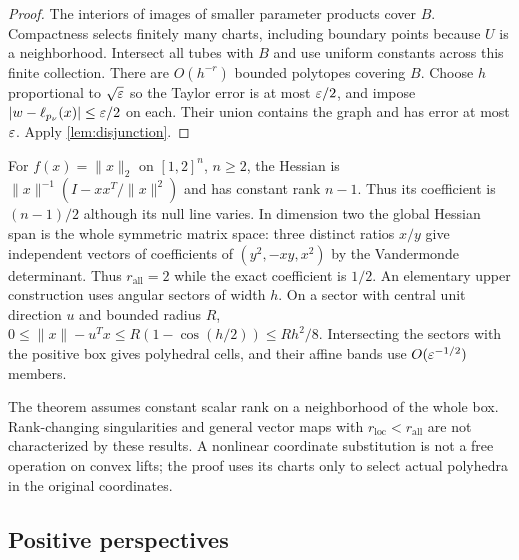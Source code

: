 \begin{proof}
The interiors of images of smaller parameter products cover $B$.
Compactness selects finitely many charts, including boundary points
because $U$ is a neighborhood. Intersect all tubes with $B$ and use
uniform constants across this finite collection. There are
$O(h^{-r})$ bounded polytopes covering $B$. Choose $h$ proportional
to $\sqrt{\varepsilon}$ so the Taylor error is at most $\varepsilon/2$, and impose
$|w-\ell_{p_\nu}(x)|\le\varepsilon/2$ on each. Their union contains the graph
and has error at most $\varepsilon$. Apply \cref{lem:disjunction}.
\end{proof}

For $f(x)=\|x\|_2$ on $[1,2]^n$, $n\ge2$, the Hessian is
$\|x\|^{-1}(I-xx^T/\|x\|^2)$ and has constant rank $n-1$.
Thus its coefficient is $(n-1)/2$ although its null line varies.
In dimension two the global Hessian span is the whole symmetric
matrix space: three distinct ratios $x/y$ give independent vectors
of coefficients of $(y^2,-xy,x^2)$ by the Vandermonde determinant.
Thus $r_{\mathrm{all}}=2$ while the exact coefficient is $1/2$.
An elementary upper construction uses angular sectors of width $h$.
On a sector with central unit direction $u$ and bounded radius $R$,
$0\le\|x\|-u^Tx\le R(1-\cos(h/2))\le Rh^2/8$.
Intersecting the sectors with the positive box gives polyhedral cells,
and their affine bands use $O(\varepsilon^{-1/2})$ members.

The theorem assumes constant scalar rank on a neighborhood of the
whole box. Rank-changing singularities and general vector maps with
$r_{\mathrm{loc}}<r_{\mathrm{all}}$ are not characterized by these
results. A nonlinear coordinate substitution is not a free operation
on convex lifts; the proof uses its charts only to select actual
polyhedra in the original coordinates.

\subsection{Positive perspectives}\label{subsec:perspective}

